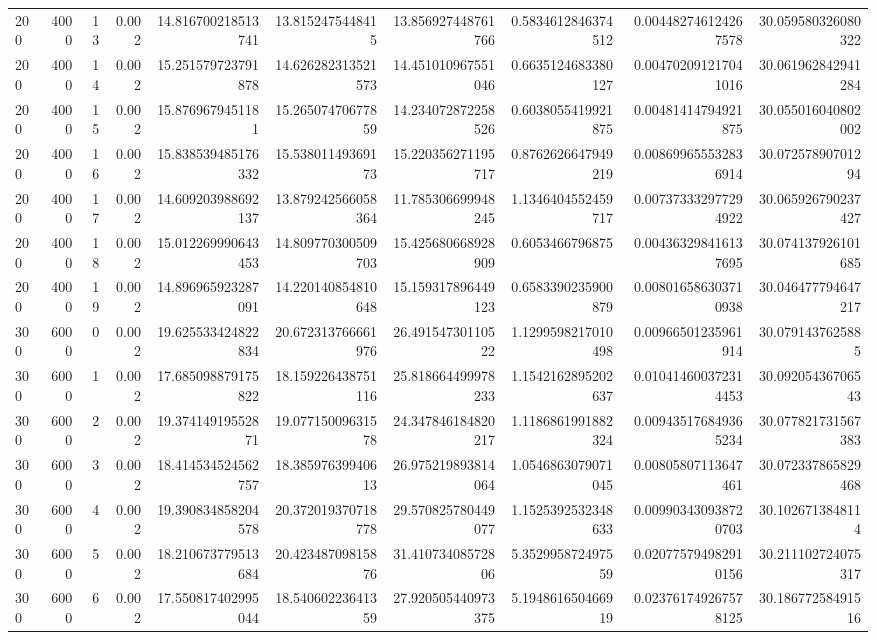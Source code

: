 \begin{tabular}{lrrrrrrrrr}
200 & 4000 & 13 & 0.002 & 14.816700218513741 & 13.8152475448415 & 13.856927448761766 & 0.5834612846374512 & 0.004482746124267578 & 30.059580326080322 \\
200 & 4000 & 14 & 0.002 & 15.251579723791878 & 14.626282313521573 & 14.451010967551046 & 0.6635124683380127 & 0.004702091217041016 & 30.061962842941284 \\
200 & 4000 & 15 & 0.002 & 15.8769679451181 & 15.26507470677859 & 14.234072872258526 & 0.6038055419921875 & 0.00481414794921875 & 30.055016040802002 \\
200 & 4000 & 16 & 0.002 & 15.838539485176332 & 15.53801149369173 & 15.220356271195717 & 0.8762626647949219 & 0.008699655532836914 & 30.07257890701294 \\
200 & 4000 & 17 & 0.002 & 14.609203988692137 & 13.879242566058364 & 11.785306699948245 & 1.1346404552459717 & 0.007373332977294922 & 30.065926790237427 \\
200 & 4000 & 18 & 0.002 & 15.012269990643453 & 14.809770300509703 & 15.425680668928909 & 0.6053466796875 & 0.004363298416137695 & 30.074137926101685 \\
200 & 4000 & 19 & 0.002 & 14.896965923287091 & 14.220140854810648 & 15.159317896449123 & 0.6583390235900879 & 0.008016586303710938 & 30.046477794647217 \\
300 & 6000 & 0 & 0.002 & 19.625533424822834 & 20.672313766661976 & 26.49154730110522 & 1.1299598217010498 & 0.00966501235961914 & 30.0791437625885 \\
300 & 6000 & 1 & 0.002 & 17.685098879175822 & 18.159226438751116 & 25.818664499978233 & 1.1542162895202637 & 0.010414600372314453 & 30.09205436706543 \\
300 & 6000 & 2 & 0.002 & 19.37414919552871 & 19.07715009631578 & 24.347846184820217 & 1.1186861991882324 & 0.009435176849365234 & 30.077821731567383 \\
300 & 6000 & 3 & 0.002 & 18.414534524562757 & 18.38597639940613 & 26.975219893814064 & 1.0546863079071045 & 0.00805807113647461 & 30.072337865829468 \\
300 & 6000 & 4 & 0.002 & 19.390834858204578 & 20.372019370718778 & 29.570825780449077 & 1.1525392532348633 & 0.009903430938720703 & 30.1026713848114 \\
300 & 6000 & 5 & 0.002 & 18.210673779513684 & 20.42348709815876 & 31.41073408572806 & 5.352995872497559 & 0.020775794982910156 & 30.211102724075317 \\
300 & 6000 & 6 & 0.002 & 17.550817402995044 & 18.54060223641359 & 27.920505440973375 & 5.194861650466919 & 0.023761749267578125 & 30.18677258491516 \\

\end{tabular}
